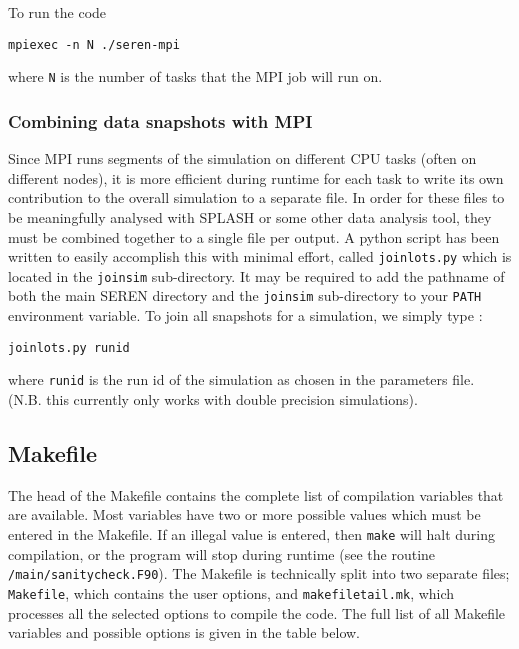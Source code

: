 \documentclass[a4paper]{article}
\newcommand{\NAME}{SEREN }
\newcommand{\var}[1]{\texttt{#1}}
\begin{document}
\noindent To run the code \newline

\var{mpiexec -n N ./seren-mpi} \newline

\noindent where {\var N} is the number of tasks that the MPI job will run on. 


\subsubsection{Combining data snapshots with MPI}
Since MPI runs segments of the simulation on different CPU tasks (often on different nodes), it is more efficient during runtime for each task to write its own contribution to the overall simulation to a separate file.  In order for these files to be meaningfully analysed with SPLASH or some other data analysis tool, they must be combined together to a single file per output.  A python script has been written to easily accomplish this with minimal effort, called \var{joinlots.py} which is located in the \var{joinsim} sub-directory.  It may be required to add the pathname of both the main \NAME directory and the \var{joinsim} sub-directory to your \var{PATH} environment variable.  To join all snapshots for a simulation, we simply type : \newline

\var{joinlots.py runid} \newline

\noindent where \var{runid} is the run id of the simulation as chosen in the parameters file.  (N.B. this currently only works with double precision simulations).


\newpage



\subsection{Makefile} \label{SS:MAKEFILE}
The head of the Makefile contains the complete list of compilation variables that are available.  Most variables have two or more possible values which must be entered in the Makefile.  If an illegal value is entered, then \var{make} will halt during compilation, or the program will stop during runtime (see the routine \var{/main/sanitycheck.F90}).  The Makefile is technically split into two separate files; \var{Makefile}, which contains the user options, and \var{makefiletail.mk}, which processes all the selected options to compile the code.  The full list of all Makefile variables and possible options is given in the table below. 
\newline
\end{document}
